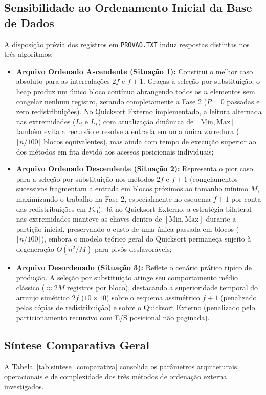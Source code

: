 \documentclass[12pt,a4paper]{article}
\begin{document}
\subsection{Sensibilidade ao Ordenamento Inicial da Base de Dados}
A disposição prévia dos registros em \texttt{PROVAO.TXT} induz respostas distintas nos três algoritmos:
\begin{itemize}
    \item \textbf{Arquivo Ordenado Ascendente (Situação 1):} Constitui o melhor caso absoluto para as intercalações $2f$ e $f+1$. Graças à seleção por substituição, o heap produz um único bloco contínuo abrangendo todos os $n$ elementos sem congelar nenhum registro, zerando completamente a Fase 2 ($P = 0$ passadas e zero redistribuições). No Quicksort Externo implementado, a leitura alternada nas extremidades ($L_i$ e $L_s$) com atualização dinâmica de $[\text{Min}, \text{Max}]$ também evita a recursão e resolve a entrada em uma única varredura ($\lceil n / 100 \rceil$ blocos equivalentes), mas ainda com tempo de execução superior ao dos métodos em fita devido aos acessos posicionais individuais;
    \item \textbf{Arquivo Ordenado Descendente (Situação 2):} Representa o pior caso para a seleção por substituição nos métodos $2f$ e $f+1$ (congelamentos sucessivos fragmentam a entrada em blocos próximos ao tamanho mínimo $M$, maximizando o trabalho na Fase 2, especialmente no esquema $f+1$ por conta das redistribuições em $F_{20}$). Já no Quicksort Externo, a estratégia bilateral nas extremidades manteve as chaves dentro de $[\text{Min}, \text{Max}]$ durante a partição inicial, preservando o custo de uma única passada em blocos ($\lceil n / 100 \rceil$), embora o modelo teórico geral do Quicksort permaneça sujeito à degeneração $O(n^2/M)$ para pivôs desfavoráveis;
    \item \textbf{Arquivo Desordenado (Situação 3):} Reflete o cenário prático típico de produção. A seleção por substituição atinge seu comportamento médio clássico ($\approx 2M$ registros por bloco), destacando a superioridade temporal do arranjo simétrico $2f$ ($10 \times 10$) sobre o esquema assimétrico $f+1$ (penalizado pelas cópias de redistribuição) e sobre o Quicksort Externo (penalizado pelo particionamento recursivo com E/S posicional não paginada).
\end{itemize}

\subsection{Síntese Comparativa Geral}
A Tabela~\ref{tab:sintese_comparativa} consolida os parâmetros arquiteturais, operacionais e de complexidade dos três métodos de ordenação externa investigados.
\end{document}
